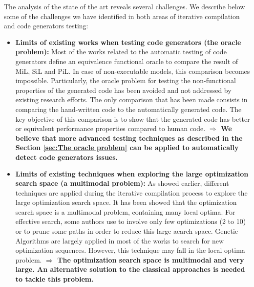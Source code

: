 The analysis of the state of the art reveals several challenges. We describe below some of the challenges we have identified in both areas of iterative compilation and code generators testing:
\begin{itemize}
	
\item \textbf{Limits of existing works when testing code generators (the oracle problem):} Most of the works related to the automatic testing of code generators define an equivalence functional oracle to compare the result of MiL, SiL and PiL. In case of non-executable models, this comparison becomes impossible. Particularly, the oracle problem for testing the non-functional properties of the generated code  has been avoided and not addressed by existing research efforts. The only comparison that has been made consists in comparing the hand-written code to the automatically generated code. The key objective of this comparison is to show that the generated code has better or equivalent performance properties compared to human code.\newline
\textbf{$\Rightarrow$ 
	We believe that more advanced testing techniques as described in the Section \ref{sec:The oracle problem} can be applied to automatically detect code generators issues.}
	
\item \textbf{Limits of existing techniques when exploring the large optimization search space (a multimodal problem):}
As showed earlier, different techniques are applied during the iterative compilation process to explore the large optimization search space. It has been showed that the optimization search space is a multimodal problem, containing many local optima.
For effective search, some authors use to involve only few optimizations (2 to 10) or to prune some paths in order to reduce this large aearch space.
Genetic Algorithms are largely applied in most of the works to search for new optimization sequences. However, this technique may fall in the local optima problem. 
\newline
\textbf{$\Rightarrow$ The optimization search space is multimodal and very large. An alternative solution to the classical approaches is needed to tackle this problem.}
	

\end{itemize}
